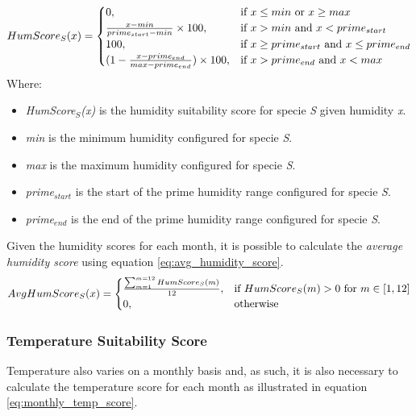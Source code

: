 \begin{equation}
\centering
HumScore_{S}(x) = 
\begin{cases}
    0, & \text{if } x \leq min \text{ or } x \geq max \\
    \frac{x - min}{prime_{start} - min} \times 100, & \text{if } x > min \text{ and } x < prime_{start} \\
    100, & \text{if } x \geq prime_{start} \text{ and } x \leq prime_{end} \\
    (1 - \frac{x - prime_{end}}{max-prime_{end}}) \times 100, & \text{if } x > prime_{end} \text{ and } x < max \\
\end{cases}
\label{eq:monthly_humidity_score}
\end{equation}
Where:
\begin{itemize}
\item \textit{HumScore$_{S}$(x)} is the humidity suitability score for specie \textit{S} given humidity \textit{x}.
\item \textit{min} is the minimum humidity configured for specie \textit{S}.
\item \textit{max} is the maximum humidity configured for specie \textit{S}.
\item \textit{prime$_{start}$} is the start of the prime humidity range configured for specie \textit{S}.
\item \textit{prime$_{end}$} is the end of the prime humidity range configured for specie \textit{S}.
\end{itemize}

Given the humidity scores for each month, it is possible to calculate the \textit{average humidity score} using equation \ref{eq:avg_humidity_score}. 
\begin{equation}
\centering
AvgHumScore_{S}(x) =
\begin{cases}
	\frac{\sum_{m=1}^{m=12} HumScore_{S}(m)}{12}, & \text{if } HumScore_{S}(m) > 0 \text{ for } m \in [1,12] \\
    0,              & \text{otherwise}
\end{cases}
\label{eq:avg_humidity_score}
\end{equation}

\subsubsection{Temperature Suitability Score}

Temperature also varies on a monthly basis and, as such, it is also necessary to calculate the temperature score for each month as illustrated in equation \ref{eq:monthly_temp_score}.

